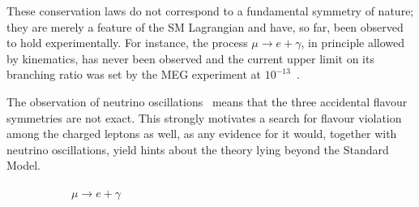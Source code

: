 These conservation laws do not correspond to a fundamental symmetry of nature;
they are merely a feature of the SM Lagrangian and have, so far, been observed
to hold experimentally. For instance, the process ${\mu \rightarrow e +
\gamma}$, in principle allowed by kinematics, has never been observed and the
current upper limit on its branching ratio was set by the MEG experiment at
$10^{-13}$~\cite{mori2016final}.

The observation of neutrino oscillations~\cite{PhysRevLett.81.1562} means that
the three accidental flavour symmetries are not exact. This strongly
motivates a search for flavour violation among the charged leptons as well, as
any evidence for it would, together with neutrino oscillations, yield hints
about the theory lying beyond the Standard Model.

\begin{figure}
\centering
\begin{subfigure}[t]{0.45\textwidth}
    \centering
    \caption{
        $\mu \rightarrow e + \gamma$
    }
    \label{fig:mu_e_nu_osc}
\end{subfigure}
\begin{subfigure}[t]{0.45\textwidth}
    \centering
\end{subfigure}
\end{figure}

